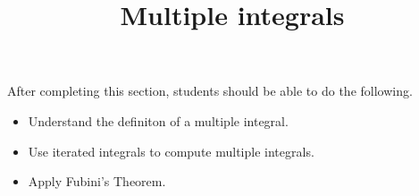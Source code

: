\documentclass{ximera}
\title{Multiple integrals}
\begin{document}
\begin{abstract}
\end{abstract}
\maketitle

\begin{sectionOutcomes}

After completing this section, students should be able to do the following.

\begin{itemize}
\item Understand the definiton of a multiple integral.
\item Use iterated integrals to compute multiple integrals.
\item Apply Fubini's Theorem.
\end{itemize}

\end{sectionOutcomes}
\end{document}
